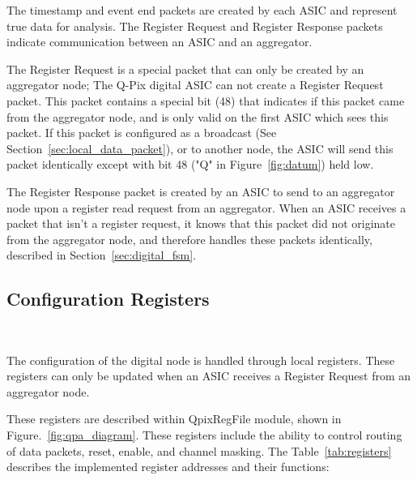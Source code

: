 The timestamp and event end packets are created by each ASIC and represent true data for analysis.
The Register Request and Register Response packets indicate communication between an ASIC and an aggregator.

The Register Request is a special packet that can only be created by an aggregator node; The Q-Pix digital ASIC can not create a Register Request packet.
This packet contains a special bit (48) that indicates if this packet came from the aggregator node, and is only valid on the first ASIC which sees this packet.
If this packet is configured as a broadcast (See Section~\ref{sec:local_data_packet}), or to another node, the ASIC will send this packet identically except with bit 48 ("Q" in Figure~\ref{fig:datum}) held low.

The Register Response packet is created by an ASIC to send to an aggregator node upon a register read request from an aggregator.
When an ASIC receives a packet that isn't a register request, it knows that this packet did not originate from the aggregator node, and therefore handles these packets identically, described in Section~\ref{sec:digital_fsm}.

\subsection{Configuration Registers}~\label{sec:registers}

The configuration of the digital node is handled through local registers.
These registers can only be updated when an ASIC receives a Register Request from an aggregator node.

These registers are described within QpixRegFile module, shown in Figure.~\ref{fig:qpa_diagram}.
These registers include the ability to control routing of data packets, reset, enable, and channel masking.
The Table~\ref{tab:registers} describes the implemented register addresses and their functions:

